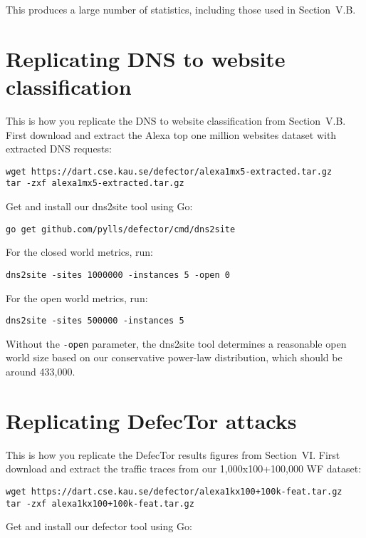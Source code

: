 \documentclass{article}
\newcommand{\name}{DefecTor\xspace}
\begin{document}
This produces a large number of statistics, including those used in Section~V.B.

\section{Replicating DNS to website classification}
This is how you replicate the DNS to website classification from Section~V.B.
First download and extract the Alexa top one million websites dataset with
extracted DNS requests:

\begin{lstlisting}
wget https://dart.cse.kau.se/defector/alexa1mx5-extracted.tar.gz
tar -zxf alexa1mx5-extracted.tar.gz
\end{lstlisting}

Get and install our dns2site tool using Go:

\begin{lstlisting}
go get github.com/pylls/defector/cmd/dns2site
\end{lstlisting}

For the closed world metrics, run:

\begin{lstlisting}
dns2site -sites 1000000 -instances 5 -open 0
\end{lstlisting}

For the open world metrics, run:

\begin{lstlisting}
dns2site -sites 500000 -instances 5
\end{lstlisting}

Without the \texttt{-open} parameter, the dns2site tool determines a reasonable
open world size based on our conservative power-law distribution,
which should be around 433,000.

\section{Replicating \name attacks}
This is how you replicate the \name results figures from Section~VI.  First
download and extract the traffic traces from our 1,000x100+100,000 WF dataset:

\begin{lstlisting}
wget https://dart.cse.kau.se/defector/alexa1kx100+100k-feat.tar.gz
tar -zxf alexa1kx100+100k-feat.tar.gz
\end{lstlisting}

Get and install our defector tool using Go:
\end{document}
